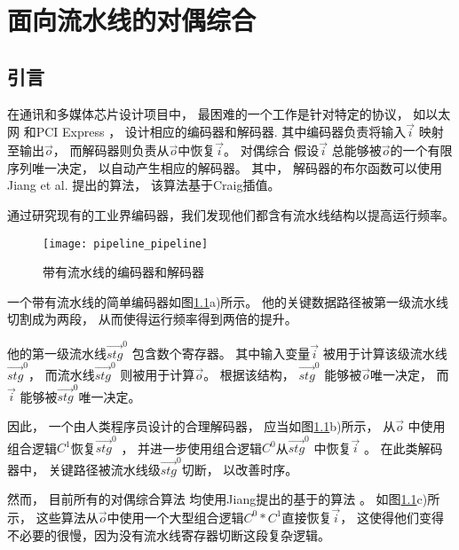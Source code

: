 \chapter{面向流水线的对偶综合}
\label{chap:5}

\section{引言}
在通讯和多媒体芯片设计项目中，
最困难的一个工作是针对特定的协议，
如以太网\cite{IEEE8023_S4} 和PCI Express \cite{pcie21}，
设计相应的编码器和解码器.
其中编码器负责将输入$\vec{i}$ 映射至输出$\vec{o}$，
而解码器则负责从$\vec{o}$中恢复$\vec{i}$。
对偶综合\cite{ShenICCAD09,ShenTCAD11,ShenTCAD12,LiuICCAD11,LiuTCAD12,TuDAC13}
假设$\vec{i}$ 总能够被$\vec{o}$的一个有限序列唯一决定，
以自动产生相应的解码器。
其中，
解码器的布尔函数可以使用Jiang et al. \cite{InterpBoolFunction}提出的算法，
该算法基于Craig插值\cite{Craig}。

通过研究现有的工业界编码器，我们发现他们都含有流水线结构以提高运行频率。
\begin{figure}[t]
\begin{center}
\texttt{[image: pipeline\_pipeline]}
\end{center}
\caption{带有流水线的编码器和解码器}
  \label{fig_pipe}
\end{figure}

一个带有流水线的简单编码器如图\ref{fig_pipe}a)所示。
他的关键数据路径被第一级流水线切割成为两段，
从而使得运行频率得到两倍的提升。

他的第一级流水线$\vec{stg}^0$ 包含数个寄存器。
其中输入变量$\vec{i}$ 被用于计算该级流水线$\vec{stg}^0$，
而流水线$\vec{stg}^0$ 则被用于计算$\vec{o}$。
根据该结构，
$\vec{stg}^0$ 能够被$\vec{o}$唯一决定，
而$\vec{i}$ 能够被$\vec{stg}^0$唯一决定。

因此，
一个由人类程序员设计的合理解码器，
应当如图\ref{fig_pipe}b)所示，
从$\vec{o}$ 中使用组合逻辑$C^1$恢复$\vec{stg}^0$ ，
并进一步使用组合逻辑$C^0$从$\vec{stg}^0$ 中恢复$\vec{i}$ 。
在此类解码器中，
关键路径被流水线级$\vec{stg}^0$切断，
以改善时序。



然而，
目前所有的对偶综合算法\cite{ShenTCAD11,ShenTCAD12,LiuICCAD11,LiuTCAD12,TuDAC13}
均使用Jiang提出的基于\cite{Craig}的算法 \cite{InterpBoolFunction}。
如图\ref{fig_pipe}c)所示，
这些算法从$\vec{o}$中使用一个大型组合逻辑$C^0*C^1$直接恢复$\vec{i}$，
这使得他们变得不必要的很慢，因为没有流水线寄存器切断这段复杂逻辑。

